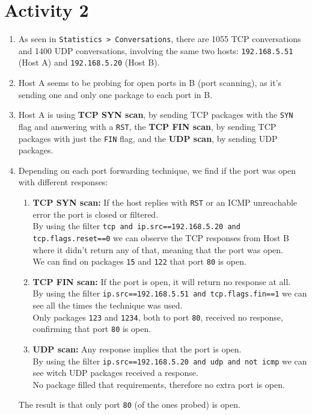 \section*{Activity 2}
\begin{enumerate}
    \item As seen in \texttt{Statistics > Conversations}, there are 1055 TCP conversations and 1400 UDP conversations, involving the same two hosts: \texttt{192.168.5.51} (Host A) and \texttt{192.168.5.20} (Host B).
    \item Host A seems to be probing for open ports in B (port scanning), as it's sending one and only one package to each port in B.
    \item Host A is using \textbf{TCP SYN scan}, by sending TCP packages with the \texttt{SYN} flag and answering with a \texttt{RST}, the \textbf{TCP FIN scan}, by sending TCP packages with just the \texttt{FIN} flag, and the \textbf{UDP scan}, by sending UDP packages.
    \item Depending on each port forwarding technique, we find if the port was open with different responses:
    \begin{enumerate}
        \item \textbf{TCP SYN scan:} If the host replies with \texttt{RST} or an ICMP unreachable error the port is closed or filtered.\\
        By using the filter \texttt{tcp and ip.src==192.168.5.20 and tcp.flags.reset==0} we can observe the TCP responses from Host B where it didn't return any of that, meaning that the port was open.\\
        We can find on packages \texttt{15} and \texttt{122} that port \texttt{80} is open.
        \item \textbf{TCP FIN scan:} If the port is open, it will return no response at all.\\
        By using the filter \texttt{ip.src==192.168.5.51 and tcp.flags.fin==1} we can see all the times the technique was used.\\
        Only packages \texttt{123} and \texttt{1234}, both to port \texttt{80}, received no response, confirming that port \texttt{80} is open.
        \item \textbf{UDP scan:} Any response implies that the port is open.\\
        By using the filter \texttt{ip.src==192.168.5.20 and udp and not icmp} we can see witch UDP packages received a response.\\
        No package filled that requirements, therefore no extra port is open.
    \end{enumerate}
    The result is that only port \texttt{80} (of the ones probed) is open.
\end{enumerate}


